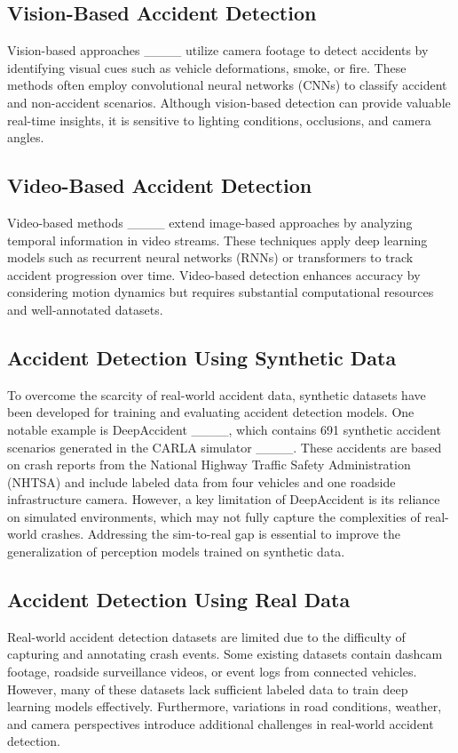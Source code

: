 \subsection{Vision-Based Accident Detection}
Vision-based approaches ____ utilize camera footage to detect accidents by identifying visual cues such as vehicle deformations, smoke, or fire. These methods often employ convolutional neural networks (CNNs) to classify accident and non-accident scenarios. Although vision-based detection can provide valuable real-time insights, it is sensitive to lighting conditions, occlusions, and camera angles.

\subsection{Video-Based Accident Detection}
Video-based methods ____ extend image-based approaches by analyzing temporal information in video streams. These techniques apply deep learning models such as recurrent neural networks (RNNs) or transformers to track accident progression over time. Video-based detection enhances accuracy by considering motion dynamics but requires substantial computational resources and well-annotated datasets.

\subsection{Accident Detection Using Synthetic Data}
To overcome the scarcity of real-world accident data, synthetic datasets have been developed for training and evaluating accident detection models. One notable example is DeepAccident ____, which contains 691 synthetic accident scenarios generated in the CARLA simulator ____. These accidents are based on crash reports from the National Highway Traffic Safety Administration (NHTSA) and include labeled data from four vehicles and one roadside infrastructure camera. However, a key limitation of DeepAccident is its reliance on simulated environments, which may not fully capture the complexities of real-world crashes. Addressing the sim-to-real gap is essential to improve the generalization of perception models trained on synthetic data.

\subsection{Accident Detection Using Real Data}
Real-world accident detection datasets are limited due to the difficulty of capturing and annotating crash events. Some existing datasets contain dashcam footage, roadside surveillance videos, or event logs from connected vehicles. However, many of these datasets lack sufficient labeled data to train deep learning models effectively. Furthermore, variations in road conditions, weather, and camera perspectives introduce additional challenges in real-world accident detection.

